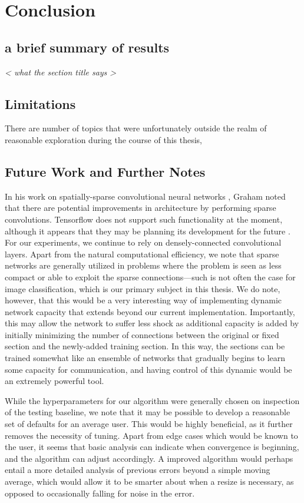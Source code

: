 \chapter{Conclusion}
\section{a brief summary of results}
\emph{ < what the section title says > }

\section{Limitations}
There are number of topics that were unfortunately outside the realm of reasonable exploration during the course of this thesis,
\section{Future Work and Further Notes}
In his work on spatially-sparse convolutional neural networks \cite{graham2014spatially}, Graham noted that there are potential improvements in architecture by performing sparse convolutions.
Tensorflow does not support such functionality at the moment, although it appears that they may be planning its development for the future \cite{spatiallysparseconv}.
For our experiments, we continue to rely on densely-connected convolutional layers.
Apart from the natural computational efficiency, we note that sparse networks are generally utilized in problems where the problem is seen as less compact or able to exploit the sparse connections---such is not often the case for image classification, which is our primary subject in this thesis.
We do note, however, that this would be a very interesting way of implementing dynamic network capacity that extends beyond our current implementation.
Importantly, this may allow the network to suffer less shock as additional capacity is added by initially minimizing the number of connections between the original or fixed section and the newly-added training section.
In this way, the sections can be trained somewhat like an ensemble of networks that gradually begins to learn some capacity for communication, and having control of this dynamic would be an extremely powerful tool.




While the hyperparameters for our algorithm were generally chosen on inspection of the testing baseline, we note that it may be possible to develop a reasonable set of defaults for an average user.
This would be highly beneficial, as it further removes the necessity of tuning.
Apart from edge cases which would be known to the user, it seems that basic analysis can indicate when convergence is beginning, and the algorithm can adjust accordingly.
A improved algorithm would perhaps entail a more detailed analysis of previous errors beyond a simple moving average, which would allow it to be smarter about when a resize is necessary, as opposed to occasionally falling for noise in the error.

